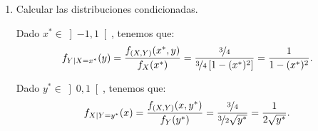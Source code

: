 \begin{ejercicio}
\begin{enumerate}
        Para $x\in \left]-1,1\right[$, tenemos que:
        \begin{align*}
            f_X(x) &= \int_{-\infty}^{+\infty} f(x, y) \, dy = \int_{x^2}^{1} \dfrac{3}{4} \, dy = \dfrac{3}{4}\left[y\right]_{x^2}^1 = \dfrac{3}{4}\left[1-x^2\right].
        \end{align*}

        Para $y\in \left]0,1\right[$, tenemos que:
        \begin{align*}
            f_Y(y) &= \int_{-\infty}^{+\infty} f(x, y) \, dx = \int_{-\sqrt{y}}^{\sqrt{y}} \dfrac{3}{4} \, dx = \dfrac{3}{4}\left[x\right]_{-\sqrt{y}}^{\sqrt{y}} = \dfrac{3}{4}\left[\sqrt{y}+\sqrt{y}\right] = \dfrac{3}{2}\sqrt{y}.
        \end{align*}
        \item Calcular las distribuciones condicionadas.
        
        Dado $x^\ast\in \left]-1,1\right[$, tenemos que:
        \begin{equation*}
            f_{Y\mid X=x^\ast} (y) = \dfrac{f_{(X,Y)}(x^\ast, y)}{f_X(x^\ast)} = \dfrac{\nicefrac{3}{4}}{\nicefrac{3}{4}\left[1-(x^\ast)^2\right]} = \dfrac{1}{1-(x^\ast)^2}.
        \end{equation*}

        Dado $y^\ast\in \left]0,1\right[$, tenemos que:
        \begin{equation*}
            f_{X\mid Y=y^\ast} (x) = \dfrac{f_{(X,Y)}(x, y^\ast)}{f_Y(y^\ast)} = \dfrac{\nicefrac{3}{4}}{\nicefrac{3}{2}\sqrt{y^\ast}} = \dfrac{1}{2\sqrt{y^\ast}}.
        \end{equation*}
    \end{enumerate}

\end{ejercicio}


